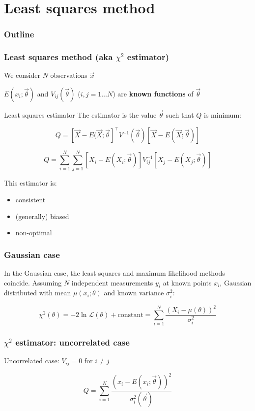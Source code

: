 \documentclass[9pt]{beamer}
\begin{document}
\section{Least squares method}

\begin{frame}
 \frametitle{Outline}
 
 \tableofcontents[current]
\end{frame}

\begin{frame}
 \frametitle{Least squares method (aka $\chi^2$ estimator)}
 
 We consider $N$ observations $\vec{x}$
 
 $E(x_i;\vec{\theta})$ and $V_{ij}(\vec{\theta})$ ($i,j = 1\dots N$) are \textbf{known functions} of $\vec{\theta}$
 
 \begin{block}{Least squares estimator}
 The estimator is the value $\vec{\theta}$ such that $Q$ is minimum:
 
  $$Q = \left[ \vec{X} - E(\vec{X};\vec{\theta}\right]^\intercal V^{-1} (\vec{\theta}) \left[ \vec{X} - E(\vec{X};\vec{\theta}) \right]$$
  
  $$Q = \sum_{i=1}^N \sum_{j=1}^N \left[ X_i - E(X_i;\vec{\theta})\right] V^{-1}_{ij} \left[ X_j - E(X_j;\vec{\theta})\right]$$
 \end{block}
 
 This estimator is:
 
 \begin{itemize}
  \item consistent
  \item (generally) biased
  \item non-optimal
 \end{itemize}


\end{frame}

\begin{frame}
 \frametitle{Gaussian case}
 
 In the Gaussian case, the least squares and maximum likelihood methods coincide. Assuming $N$ independent measurements $y_i$ at known points $x_i$, Gaussian distributed with mean
 $\mu(x_i;\theta)$ and known variance $\sigma_i^2$:
 
 $$\chi^2(\theta) = -2\ln\mathcal{L}(\theta) + \text{constant} = \sum_{i=1}^N \frac{\left(X_i - \mu(\theta)\right)^2}{\sigma_i^2}$$
\end{frame}


\begin{frame}
 \frametitle{$\chi^2$ estimator: uncorrelated case}
 
 Uncorrelated case: $V_{ij} = 0 $ for $i \neq j$
 
 $$Q = \sum_{i=1}^N \frac{\left(x_i - E(x_i; \vec{\theta})\right)^2}{\sigma_i^2(\vec{\theta})}$$
\end{frame}
\end{document}
